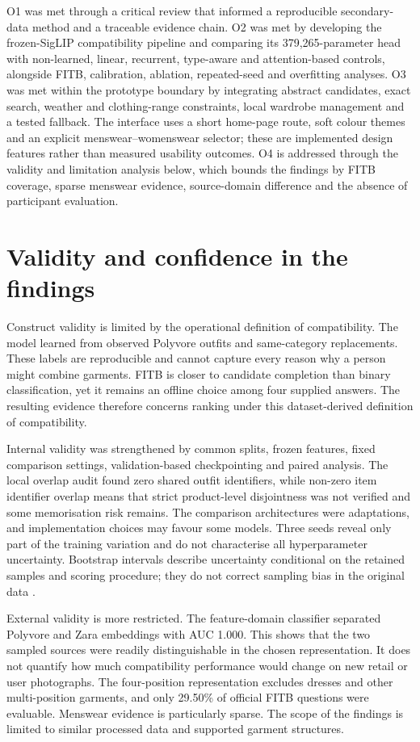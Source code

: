 O1 was met through a critical review that informed a reproducible
secondary-data method and a traceable evidence chain. O2 was met by developing
the frozen-SigLIP compatibility pipeline and comparing its
379,265-parameter head with non-learned, linear, recurrent, type-aware and
attention-based controls, alongside FITB, calibration, ablation, repeated-seed
and overfitting analyses. O3 was met within the prototype boundary by
integrating abstract candidates, exact search, weather and clothing-range
constraints, local wardrobe management and a tested fallback. The interface
uses a short home-page route, soft colour themes and an explicit
menswear--womenswear selector; these are implemented design features rather
than measured usability outcomes. O4 is addressed through the validity and
limitation analysis below, which bounds the findings by FITB coverage, sparse
menswear evidence, source-domain difference and the absence of participant
evaluation.

\section{Validity and confidence in the findings}

Construct validity is limited by the operational definition of compatibility.
The model learned from observed Polyvore outfits and same-category
replacements. These labels are reproducible and cannot capture every reason
why a person might combine garments. FITB is closer to candidate
completion than binary classification, yet it remains an offline choice among
four supplied answers. The resulting evidence therefore concerns ranking
under this dataset-derived definition of compatibility.

Internal validity was strengthened by common splits, frozen features, fixed
comparison settings, validation-based checkpointing and paired analysis. The
local overlap audit found zero shared outfit identifiers, while non-zero item
identifier overlap means that strict product-level disjointness was not
verified and some memorisation risk remains.
The comparison architectures were adaptations, and implementation choices may
favour some models. Three seeds reveal only part of the training variation and
do not characterise all hyperparameter uncertainty.
Bootstrap intervals describe uncertainty conditional on the retained samples
and scoring procedure; they do not correct sampling bias in the original data
\parencite{efron1994bootstrap,bouthillier2021variance}.

External validity is more restricted. The feature-domain classifier separated
Polyvore and Zara embeddings with AUC 1.000. This shows that the two sampled
sources were readily distinguishable in the chosen representation. It does
not quantify how much compatibility performance would change on new retail or
user photographs. The four-position representation excludes dresses and other
multi-position garments, and only 29.50\% of official FITB questions were
evaluable. Menswear evidence is particularly sparse. The scope of the findings
is limited to similar processed data and supported garment structures.

